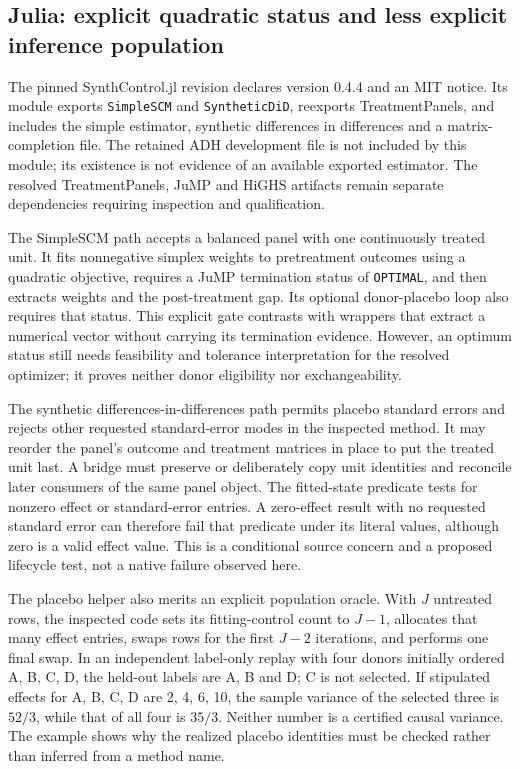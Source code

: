 \subsection{Julia: explicit quadratic status and less explicit inference population}
The pinned SynthControl.jl revision declares version 0.4.4 and an MIT notice.
Its module exports \texttt{SimpleSCM} and \texttt{SyntheticDiD}, reexports
TreatmentPanels, and includes the simple estimator, synthetic differences
in differences and a matrix-completion file. The retained ADH development
file is not included by this module; its existence is not evidence of an
available exported estimator. The resolved TreatmentPanels, JuMP and HiGHS
artifacts remain separate dependencies requiring inspection and qualification.
\citep{exec25_synthcross_julia}

The SimpleSCM path accepts a balanced panel with one continuously treated
unit. It fits nonnegative simplex weights to pretreatment outcomes using
a quadratic objective, requires a JuMP termination status of
\texttt{OPTIMAL}, and then extracts weights and the post-treatment gap.
Its optional donor-placebo loop also requires that status. This explicit
gate contrasts with wrappers that extract a numerical vector without
carrying its termination evidence. However, an optimum status still needs
feasibility and tolerance interpretation for the resolved optimizer;
it proves neither donor eligibility nor exchangeability.
\citep{exec25_synthcross_julia,exec25_synthcross_choice}

The synthetic differences-in-differences path permits placebo standard
errors and rejects other requested standard-error modes in the inspected
method. It may reorder the panel's outcome and treatment matrices in place
to put the treated unit last. A bridge must preserve or deliberately copy
unit identities and reconcile later consumers of the same panel object.
The fitted-state predicate tests for nonzero effect or standard-error
entries. A zero-effect result with no requested standard error can therefore
fail that predicate under its literal values, although zero is a valid
effect value. This is a conditional source concern and a proposed lifecycle
test, not a native failure observed here.\citep{exec25_synthcross_julia}

The placebo helper also merits an explicit population oracle. With $J$
untreated rows, the inspected code sets its fitting-control count to $J-1$,
allocates that many effect entries, swaps rows for the first $J-2$ iterations,
and performs one final swap. In an independent label-only replay with four
donors initially ordered A, B, C, D, the held-out labels are A, B and D;
C is not selected. If stipulated effects for A, B, C, D are 2, 4, 6, 10,
the sample variance of the selected three is $52/3$, while that of all four
is $35/3$. Neither number is a certified causal variance. The example shows
why the realized placebo identities must be checked rather than inferred
from a method name.\citep{exec25_synthcross_julia,exec25_synthcross_choice}

